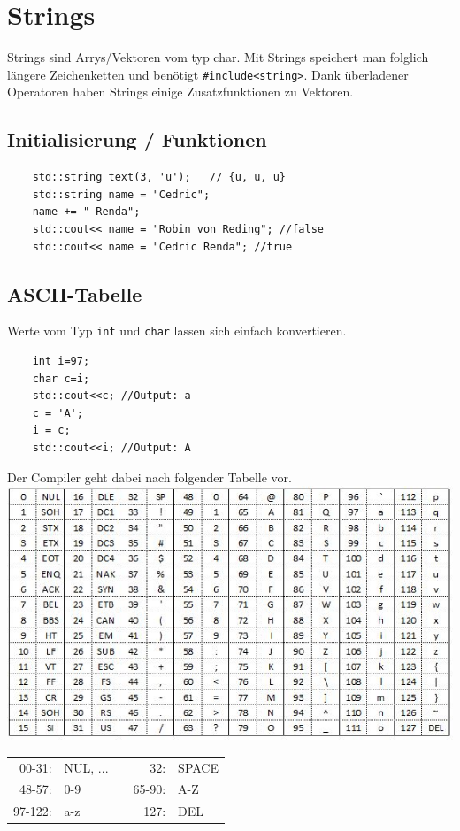\section{Strings} 
Strings sind Arrys/Vektoren vom typ char. Mit Strings speichert man folglich längere Zeichenketten und benötigt \texttt{\#include<string>}. Dank überladener Operatoren haben Strings einige Zusatzfunktionen zu Vektoren.

\subsection{Initialisierung / Funktionen}
\begin{lstlisting}
	std::string text(3, 'u'); 	// {u, u, u}
	std::string name = "Cedric";
	name += " Renda";
	std::cout<< name = "Robin von Reding"; //false
	std::cout<< name = "Cedric Renda"; //true
\end{lstlisting}
\subsection{ASCII-Tabelle}
Werte vom Typ \texttt{int} und \texttt{char} lassen sich einfach konvertieren.
\begin{lstlisting}
	int i=97;
	char c=i;
	std::cout<<c; //Output: a
	c = 'A';
	i = c;
	std::cout<<i; //Output: A
\end{lstlisting}
Der Compiler geht dabei nach folgender Tabelle vor.
\includegraphics[width=0.24 \textwidth]{sections/ASCII-Tabelle}
\begin{tabular}{rlcrl}
	00-31:& NUL, ... & \quad & 32:& SPACE\\
	48-57:& 0-9& \quad &	65-90:& A-Z \\
	97-122:& a-z & \quad & 127:& DEL\\
\end{tabular}




